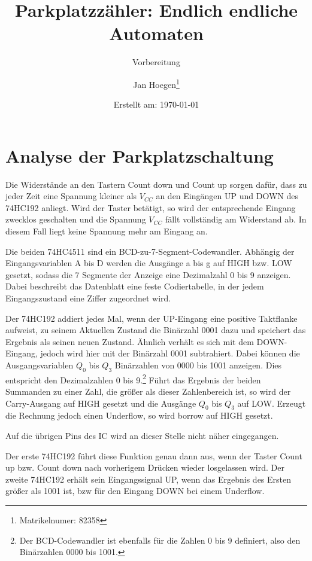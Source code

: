 \documentclass[
    paper=a4,
]{scrartcl}
\title{Parkplatzzähler: Endlich endliche Automaten}
\subtitle{Vorbereitung}
\author{Jan Hoegen\thanks{Matrikelnumer: 82358}}
\date{Erstellt am: \today}
\begin{document}
\maketitle

\tableofcontents

\newpage

\section{Analyse der Parkplatzschaltung}
    Die Widerstände an den Tastern Count down und Count up sorgen dafür, dass zu jeder Zeit eine Spannung kleiner als \(V_{CC}\) an den Eingängen UP und DOWN des 74HC192 anliegt. Wird der Taster betätigt, so wird der entsprechende Eingang zwecklos geschalten und die Spannung \(V_{CC}\) fällt vollständig am Widerstand ab. In diesem Fall liegt keine Spannung mehr am Eingang an.

    Die beiden 74HC4511 sind ein BCD-zu-7-Segment-Codewandler. Abhängig der Eingangsvariablen A bis D werden die Ausgänge a bis g auf HIGH bzw. LOW gesetzt, sodass die 7 Segmente der Anzeige eine Dezimalzahl 0 bis 9 anzeigen. Dabei beschreibt das Datenblatt eine feste Codiertabelle, in der jedem Eingangszustand eine Ziffer zugeordnet wird.

    Der 74HC192 addiert jedes Mal, wenn der UP-Eingang eine positive Taktflanke aufweist, zu seinem Aktuellen Zustand die Binärzahl 0001 dazu und speichert das Ergebnis als seinen neuen Zustand. Ähnlich verhält es sich mit dem DOWN-Eingang, jedoch wird hier mit der Binärzahl 0001 subtrahiert. Dabei können die Ausgangsvariablen \(Q_0\) bis \(Q_3\) Binärzahlen von 0000 bis 1001 anzeigen. Dies entspricht den Dezimalzahlen 0 bis 9.\footnote{Der BCD-Codewandler ist ebenfalls für die Zahlen 0 bis 9 definiert, also den Binärzahlen 0000 bis 1001.} Führt das Ergebnis der beiden Summanden zu einer Zahl, die größer als dieser Zahlenbereich ist, so wird der Carry-Ausgang auf HIGH gesetzt und die Ausgänge \(Q_0\) bis \(Q_3\) auf LOW. Erzeugt die Rechnung jedoch einen Underflow, so wird borrow auf HIGH gesetzt.

    Auf die übrigen Pins des IC wird an dieser Stelle nicht näher eingegangen.

    Der erste 74HC192 führt diese Funktion genau dann aus, wenn der Taster Count up bzw. Count down nach vorherigem Drücken wieder losgelassen wird.
    Der zweite 74HC192 erhält sein Eingangssignal UP, wenn das Ergebnis des Ersten größer als 1001 ist, bzw für den Eingang DOWN bei einem Underflow.
\end{document}
